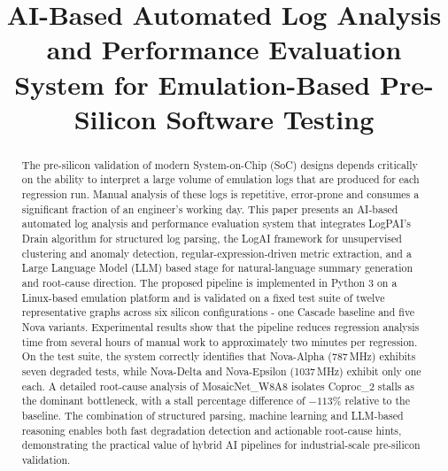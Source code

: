\documentclass[conference]{IEEEtran}
\begin{document}
\title{AI-Based Automated Log Analysis and Performance Evaluation System for Emulation-Based Pre-Silicon Software Testing}

\author{
    \and
    \and
}

\maketitle

\begin{abstract}
The pre-silicon validation of modern System-on-Chip (SoC) designs depends critically on the ability to interpret a large volume of emulation logs that are produced for each regression run. Manual analysis of these logs is repetitive, error-prone and consumes a significant fraction of an engineer's working day. This paper presents an AI-based automated log analysis and performance evaluation system that integrates LogPAI's Drain algorithm for structured log parsing, the LogAI framework for unsupervised clustering and anomaly detection, regular-expression-driven metric extraction, and a Large Language Model (LLM) based stage for natural-language summary generation and root-cause direction. The proposed pipeline is implemented in Python 3 on a Linux-based emulation platform and is validated on a fixed test suite of twelve representative graphs across six silicon configurations - one Cascade baseline and five Nova variants. Experimental results show that the pipeline reduces regression analysis time from several hours of manual work to approximately two minutes per regression. On the test suite, the system correctly identifies that Nova-Alpha (787\,MHz) exhibits seven degraded tests, while Nova-Delta and Nova-Epsilon (1037\,MHz) exhibit only one each. A detailed root-cause analysis of MosaicNet\_W8A8 isolates Coproc\_2 stalls as the dominant bottleneck, with a stall percentage difference of $-113\%$ relative to the baseline. The combination of structured parsing, machine learning and LLM-based reasoning enables both fast degradation detection and actionable root-cause hints, demonstrating the practical value of hybrid AI pipelines for industrial-scale pre-silicon validation.
\end{abstract}
\end{document}
